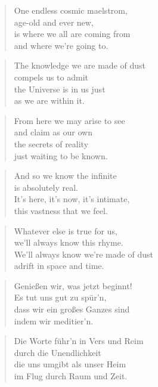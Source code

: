 \documentclass[10pt,a4paper]{article}
\begin{document}
\begin{paracol}{2}
\begin{verse}
One endless cosmic maelstrom,\\
age-old and ever new,\\
is where we all are coming from\\
and where we’re going to.
\end{verse}

\begin{verse}
The knowledge we are made of dust\\
compels us to admit\\
the Universe is in us just\\
as we are within it.
\end{verse}

\begin{verse}
From here we may arise to see\\
and claim as our own\\
the secrets of reality\\
just waiting to be known.
\end{verse}

\begin{verse}
And so we know the infinite\\
is absolutely real.\\
It’s here, it’s now, it’s intimate,\\
this vastness that we feel.
\end{verse}

\begin{verse}
Whatever else is true for us,\\
we’ll always know this rhyme.\\
We’ll always know we’re made of dust\\
adrift in space and time.
\end{verse}

\switchcolumn


\begin{verse}
Genießen wir, was jetzt beginnt! \\
Es tut uns gut zu spür’n, \\
dass wir ein großes Ganzes sind \\
indem wir meditier’n. \\
\end{verse}

\begin{verse}
Die Worte führ’n in Vers und Reim \\
durch die Unendlichkeit \\
die uns umgibt als unser Heim \\
im Flug durch Raum und Zeit. \\
\end{verse}


\end{paracol}
\end{document}

